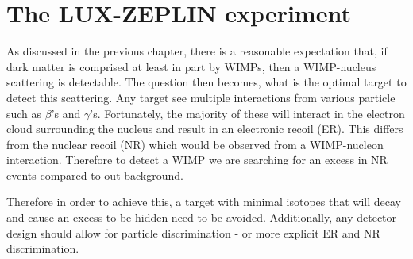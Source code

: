 \chapter{The LUX-ZEPLIN experiment}
\label{sec:lz_detector_chapter}
\par
As discussed in the previous chapter, there is a reasonable expectation that, if dark matter is comprised at least in part by WIMPs, then a WIMP-nucleus scattering is detectable.
The question then becomes, what is the optimal target to detect this scattering.
Any target see multiple interactions from various particle such as $\beta$'s and $\gamma$'s.
Fortunately, the majority of these will interact in the electron cloud surrounding the nucleus and result in an electronic recoil (ER).
This differs from the nuclear recoil (NR) which would be observed from a WIMP-nucleon interaction.
Therefore to detect a WIMP we are searching for an excess in NR events compared to out background.

\par
Therefore in order to achieve this, a target with minimal isotopes that will decay and cause an excess to be hidden need to be avoided.
Additionally, any detector design should allow for particle discrimination - or more explicit ER and NR discrimination. 





